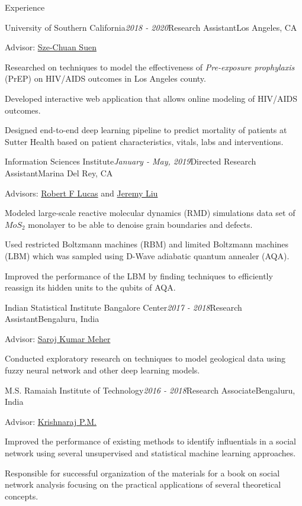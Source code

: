 \documentclass{resume} %
\begin{document}
\begin{rSection}{Experience}

\begin{rSubsection}{University of Southern California}{\em 2018 - 2020}{Research Assistant}{Los Angeles, CA}
\item[] Advisor: \href{https://szesuen.usc.edu/}{Sze-Chuan Suen}
\item Researched on techniques to model the effectiveness of {\em Pre-exposure prophylaxis} (PrEP) on HIV/AIDS outcomes in Los Angeles county.
\item Developed interactive web application that allows online modeling of HIV/AIDS outcomes.
\item Designed end-to-end deep learning pipeline to predict mortality of patients at Sutter Health based on patient characteristics, vitals, labs and interventions.
\end{rSubsection}

\begin{rSubsection}{Information Sciences Institute}{\em January - May, 2019}{Directed Research Assistant}{Marina Del Rey, CA}
\item[] Advisors: \href{https://viterbi.usc.edu/directory/faculty/Lucas/Robert}{Robert F Lucas} and \href{http://www-scf.usc.edu/~jeremyjl/}{Jeremy Liu}
\item Modeled large-scale reactive molecular dynamics (RMD) simulations data set of $MoS_{2}$ monolayer to be able to denoise grain boundaries and defects.
\item Used restricted Boltzmann machines (RBM) and limited Boltzmann machines (LBM) which was sampled using D-Wave adiabatic quantum annealer (AQA).
\item Improved the performance of the LBM by finding techniques to efficiently reassign its hidden units to the qubits of AQA.
\end{rSubsection}

\begin{rSubsection}{Indian Statistical Institute Bangalore Center}{\em 2017 - 2018}{Research Assistant}{Bengaluru, India}
\item[] Advisor: \href{https://www.isibang.ac.in/~saroj.meher/index.html}{Saroj Kumar Meher}
\item Conducted exploratory research on techniques to model geological data using fuzzy neural network and other deep learning models.
\end{rSubsection}

\begin{rSubsection}{M.S. Ramaiah Institute of Technology}{\em 2016 - 2018}{Research Associate}{Bengaluru, India}
\item[] Advisor: \href{http://www.msrit.edu/department/faculty-detail.html?dept=ise&ID=8}{Krishnaraj P.M.}
\item Improved the performance of existing methods to identify influentials in a social network using several unsupervised and statistical machine learning approaches.
\item Responsible for successful organization of the materials for a book on social network analysis focusing on the practical applications of several theoretical concepts.
\end{rSubsection}


\end{rSection}
\end{document}
